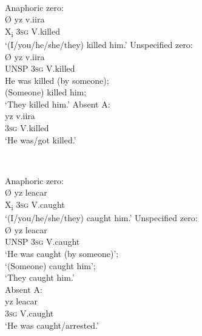 \documentclass[output=collectionpaper]{langsci/langscibook}
\begin{document}
\ea
\label{ex:Nich:21}
\footnotemark{} \\
\begin{xlist}
\ex
Anaphoric zero:	\\
\gll Ø 	yz  	v.iira\\
X\textsubscript{i}	\textsc{3sg}	V.killed\\
\glt `(I/you/he/she/they) killed him.'
\ex
Unspecified zero:\\
\gll Ø	 yz	v.iira\\
UNSP	\textsc{3sg}	V.killed\\
\glt He was killed (by someone);\\
(Someone) killed him;\\
`They killed him.'
\ex
Absent A:	\\
\gll yz   	v.iira\\
\textsc{3sg}	V.killed\\
\glt `He was/got killed.'\\
\end{xlist}
\z
{}

\ea
\label{ex:Nich:22}
 \\
\begin{xlist}
\ex
Anaphoric zero:\\
\gll	Ø	yz  	leacar\\
X\textsubscript{i}	\textsc{3sg}	V.caught \\
\glt `(I/you/he/she/they) caught him.'
\ex
Unspecified zero: \\
\gll Ø	 yz	leacar\\
UNSP	\textsc{3sg}	V.caught\\
\glt	`He was caught (by someone)';\\
`(Someone) caught him';\\
`They caught him.'\\
\ex
Absent A:\\
\gll yz   	leacar\\
\textsc{3sg}	V.caught \\
\glt `He was caught/arrested.'
\end{xlist}
\z
\end{document}
